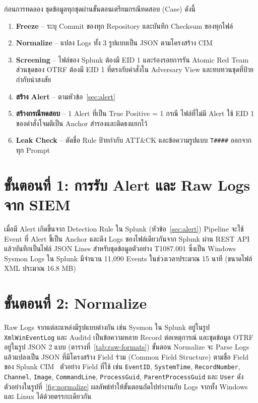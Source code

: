 ก่อนการทดลอง ชุดข้อมูลทุกชุดผ่านขั้นตอนเตรียมกรณีทดสอบ (Case) ดังนี้
\begin{enumerate}
  \item \textbf{Freeze} -- ระบุ Commit ของทุก Repository และบันทึก Checksum ของทุกไฟล์
  \item \textbf{Normalize} -- แปลง Logs ทั้ง 3 รูปแบบเป็น JSON ตามโครงสร้าง CIM
  \item \textbf{Screening} -- ไฟล์ของ Splunk ต้องมี EID 1 และร่องรอยการรัน Atomic Red Team
        ส่วนชุดของ OTRF ต้องมี EID 1 ที่ตรงกับคำสั่งใน Adversary View และทบทวนชุดที่ป้ายกำกับน่าสงสัย
  \item \textbf{สร้าง Alert} -- ตามหัวข้อ~\ref{sec:alert}
  \item \textbf{สร้างกรณีทดสอบ} -- 1 Alert ที่เป็น True Positive = 1 กรณี
        ไฟล์ที่ไม่มี Alert ใช้ EID 1 ของคำสั่งโจมตีเป็น Anchor สำรองและติดธงแยกไว้
  \item \textbf{Leak Check} -- ตัดชื่อ Rule ป้ายกำกับ ATT\&CK และข้อความรูปแบบ \texttt{T\#\#\#\#} ออกจากทุก Prompt
\end{enumerate}

\section{ขั้นตอนที่ 1: การรับ Alert และ Raw Logs จาก SIEM}

เมื่อมี Alert เกิดขึ้นจาก Detection Rule ใน Splunk (หัวข้อ~\ref{sec:alert})
Pipeline จะใช้ Event ที่ Alert ชี้เป็น Anchor และดึง Logs ของไฟล์เดียวกันจาก Splunk ผ่าน REST API
แล้วบันทึกเป็นไฟล์ JSON Lines
สำหรับชุดข้อมูลตัวอย่าง T1087.001 ซึ่งเป็น Windows Sysmon Logs ใน Splunk
มีจำนวน 11,090 Events ในช่วงเวลาประมาณ 15 นาที (ขนาดไฟล์ XML ประมาณ 16.8 MB)

\section{ขั้นตอนที่ 2: Normalize}

Raw Logs จากแต่ละแหล่งมีรูปแบบต่างกัน เช่น Sysmon ใน Splunk อยู่ในรูป \texttt{XmlWinEventLog}
และ Auditd เป็นข้อความหลาย Record ต่อเหตุการณ์
และชุดข้อมูล OTRF อยู่ในรูป JSON 2 แบบ (ตารางที่~\ref{tab:raw-formats})
ขั้นตอน Normalize จะ Parse Logs แล้วแปลงเป็น JSON ที่มีโครงสร้าง Field ร่วม (Common Field Structure)
ตามชื่อ Field ของ Splunk CIM~\cite{splunk-cim} ตัวอย่าง Field ที่ใช้ เช่น \texttt{EventID}, \texttt{SystemTime}, \texttt{RecordNumber},
\texttt{Channel}, \texttt{Image}, \texttt{CommandLine}, \texttt{ProcessGuid}, \texttt{ParentProcessGuid} และ \texttt{User}
ดังตัวอย่างในรูปที่~\ref{fig:normalize}
ผลลัพธ์ทำให้ขั้นตอนถัดไปทำงานกับ Logs จากทั้ง Windows และ Linux ได้ด้วยตรรกะเดียวกัน

